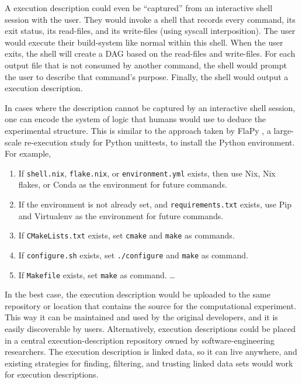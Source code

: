 \documentclass[manuscript,authordraft]{acmart}
\providecommand{\tightlist}{\setlength{\itemsep}{0pt}\setlength{\parskip}{0pt}}
\begin{document}
A execution description could even be ``captured'' from an interactive
shell session with the user. They would invoke a shell that records
every command, its exit status, its read-files, and its write-files
(using syscall interposition). The user would execute their build-system
like normal within this shell. When the user exits, the shell will
create a DAG based on the read-files and write-files. For each output
file that is not consumed by another command, the shell would prompt the
user to describe that command's purpose. Finally, the shell would output
a execution description.

In cases where the description cannot be captured by an interactive
shell session, one can encode the system of logic that humans would use
to deduce the experimental structure. This is similar to the approach
taken by FlaPy \cite{gruber_empirical_2021}, a large-scale re-execution
study for Python unittests, to install the Python environment. For
example,

\begin{enumerate}
\def\labelenumi{\arabic{enumi}.}
\tightlist
\item
  If \texttt{shell.nix}, \texttt{flake.nix}, or \texttt{environment.yml}
  exists, then use Nix, Nix flakes, or Conda as the environment for
  future commands.
\item
  If the environment is not already set, and \texttt{requirements.txt}
  exists, use Pip and Virtualenv as the environment for future commands.
\item
  If \texttt{CMakeLists.txt} exists, set \texttt{cmake} and
  \texttt{make} as commands.
\item
  If \texttt{configure.sh} exists, set \texttt{./configure} and
  \texttt{make} as command.
\item
  If \texttt{Makefile} exists, set \texttt{make} as command. \ldots{}
\end{enumerate}

In the best case, the execution description would be uploaded to the
same repository or location that contains the source for the
computational experiment. This way it can be maintained and used by the
original developers, and it is easily discoverable by users.
Alternatively, execution descriptions could be placed in a central
execution-description repository owned by software-engineering
researchers. The execution description is linked data, so it can live
anywhere, and existing strategies for finding, filtering, and trusting
linked data sets would work for execution descriptions.
\end{document}
